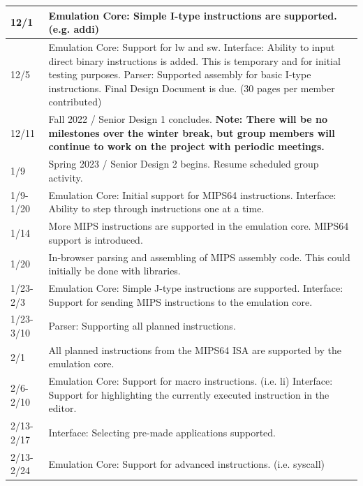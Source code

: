 \documentclass[
    paper=letter,
    parskip=half,
    fontsize=12pt,
    titlepage=firstiscover,
    toc=bibliography,
    numbers=endperiod
]{scrartcl}
\begin{document}
{\begin{tabularx}{\textwidth}{|l|X|}
        12/1          & Emulation Core: Simple I-type instructions are supported. (e.g. addi) \\\hline
        12/5          & Emulation Core: Support for lw and sw. \newline Interface: Ability to input direct binary instructions is added. This is temporary and for initial testing purposes. \newline Parser: Supported assembly for basic I-type instructions. \newline Final Design Document is due. (30 pages per member contributed) \\\hline
        12/11         & Fall 2022 / Senior Design 1 concludes. \newline \textbf{Note: There will be no milestones over the winter break, but group members will continue to work on the project with periodic meetings.} \\\hline
        1/9           & Spring 2023 / Senior Design 2 begins. Resume scheduled group activity. \\\hline
        1/9-1/20      & Emulation Core: Initial support for MIPS64 instructions. \newline Interface: Ability to step through instructions one at a time. \\\hline
        1/14          & More MIPS instructions are supported in the emulation core. MIPS64 support is introduced. \\\hline
        1/20          & In-browser parsing and assembling of MIPS assembly code. This could initially be done with libraries. \\\hline
        1/23-2/3      & Emulation Core: Simple J-type instructions are supported. \newline Interface: Support for sending MIPS instructions to the emulation core. \\\hline
        1/23-3/10     & Parser: Supporting all planned instructions. \\\hline
        2/1           & All planned instructions from the MIPS64 ISA are supported by the emulation core. \\\hline
        2/6-2/10      & Emulation Core: Support for macro instructions. (i.e. li) \newline Interface: Support for highlighting the currently executed instruction in the editor. \\\hline
        2/13-2/17     & Interface: Selecting pre-made applications supported. \\\hline
        2/13-2/24     & Emulation Core: Support for advanced instructions. (i.e. syscall) \\\hline

\end{tabularx}}
\end{document}
